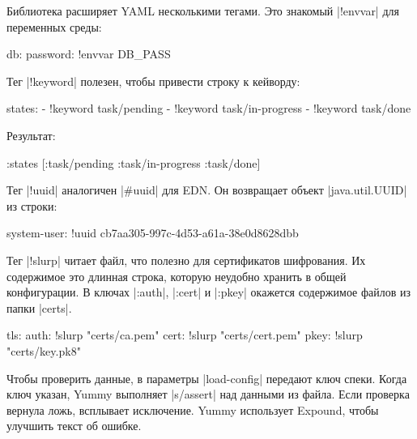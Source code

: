 Библиотека расширяет YAML несколькими тегами. Это знакомый \spverb|!envvar|
для переменных среды:

\begin{english}
  \begin{yaml}
db:
  password: !envvar DB_PASS
  \end{yaml}
\end{english}

\noindent
Тег \spverb|!keyword| полезен, чтобы привести строку к кейворду:

\begin{english}
  \begin{yaml}
states:
  - !keyword task/pending
  - !keyword task/in-progress
  - !keyword task/done
  \end{yaml}
\end{english}

\noindent
Результат:

\begin{english}
  \begin{clojure}
{:states [:task/pending :task/in-progress :task/done]}
  \end{clojure}
\end{english}

Тег \spverb|!uuid| аналогичен \spverb|#uuid| для EDN. Он возвращает объект
\spverb|java.util.UUID| из строки:

\begin{english}
  \begin{yaml}
system-user: !uuid cb7aa305-997c-4d53-a61a-38e0d8628dbb
  \end{yaml}
\end{english}

Тег \spverb|!slurp| читает файл, что полезно для сертификатов шифрования. Их
содержимое это длинная строка, которую неудобно хранить в общей конфигурации. В
ключах \spverb|:auth|, \spverb|:cert| и \spverb|:pkey| окажется содержимое
файлов из папки \spverb|certs|.

\begin{english}
  \begin{yaml}
tls:
  auth: !slurp "certs/ca.pem"
  cert: !slurp "certs/cert.pem"
  pkey: !slurp "certs/key.pk8"
  \end{yaml}
\end{english}

Чтобы проверить данные, в параметры \spverb|load-config| передают ключ
спеки. Когда ключ указан, Yummy выполняет \spverb|s/assert| над данными из
файла. Если проверка вернула ложь, всплывает исключение. Yummy использует
Expound, чтобы улучшить текст об ошибке.

